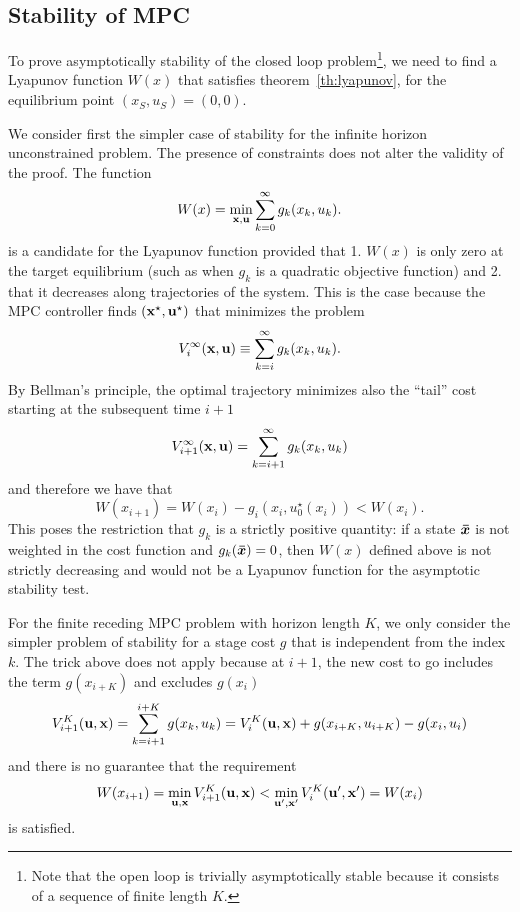 \subsection{Stability of MPC}
\label{sec:stability-MPC}

To prove asymptotically stability of the closed loop problem\footnote{Note that the open loop is trivially asymptotically stable because it consists of a sequence of finite length $K$.}, we need to find a Lyapunov function $W(x)$ that satisfies theorem~\ref{th:lyapunov}, for the equilibrium point $(x_S,u_S)=(0,0)$.

We consider first the simpler case of stability for the infinite horizon unconstrained problem. The presence of constraints does not alter the validity of the proof. The function
\begin{equation*}
  W(x) = \min_{\boldsymbol{\mathrm{x}},\boldsymbol{\mathrm{u}}} \sum_{k=0}^\infty g_k(x_k,u_k).
\end{equation*}
is a candidate for the Lyapunov function provided that 1. $W(x)$ is only zero at the target equilibrium (such as when $g_k$ is a quadratic objective function) and 2. that it decreases along trajectories of the system. This is the case because the MPC controller finds $(\boldsymbol{\mathrm{x}}^\star, \boldsymbol{\mathrm{u}}^\star)$ that minimizes the problem
\begin{equation*}
  V^\infty_i(\boldsymbol{\mathrm{x}},\boldsymbol{\mathrm{u}}) \equiv \sum_{k=i}^\infty g_k(x_k,u_k).
\end{equation*}
By Bellman's principle, the optimal trajectory minimizes also the ``tail'' cost starting at the subsequent time $i+1$
\begin{equation*}
  V_{i+1}^\infty(\boldsymbol{\mathrm{x}},\boldsymbol{\mathrm{u}}) = \sum_{k=i+1}^\infty g_k(x_k,u_k)
\end{equation*}
and therefore we have that
\begin{equation*}
  W(x_{i+1}) = W(x_i) - g_i(x_i,u_0^\star(x_i)) < W(x_i).
\end{equation*}
This poses the restriction that $g_k$ is a strictly positive quantity: if a state $\boldsymbol{\bar{x}}$ is not weighted in the cost function and $g_k(\boldsymbol{\bar{x}})=0$, then $W(x)$ defined above is not strictly decreasing and would not be a Lyapunov function for the asymptotic stability test.

For the finite receding MPC problem with horizon length $K$, we only consider the simpler problem of stability for a stage cost $g$ that is independent from the index $k$. The trick above does not apply because at $i+1$, the new cost to go includes the term $g(x_{i+K})$ and excludes $g(x_i)$
\begin{equation*}
  V^K_{i+1}(\boldsymbol{\mathrm{u}},\boldsymbol{\mathrm{x}}) = \sum_{k=i+1}^{i+K}g(x_k,u_k) = V_i^K(\boldsymbol{\mathrm{u}},\boldsymbol{\mathrm{x}}) + g(x_{i+K},u_{i+K}) - g(x_i,u_i)
\end{equation*}
and there is no guarantee that the requirement
\begin{equation*}
  W(x_{i+1}) = \min_{\boldsymbol{\mathrm{u}},\boldsymbol{\mathrm{x}}} V^K_{i+1}(\boldsymbol{\mathrm{u}},\boldsymbol{\mathrm{x}}) < \min_{\boldsymbol{\mathrm{u}}',\boldsymbol{\mathrm{x}}'} V^K_i(\boldsymbol{\mathrm{u}}',\boldsymbol{\mathrm{x}}') = W(x_i)
\end{equation*}
is satisfied.

